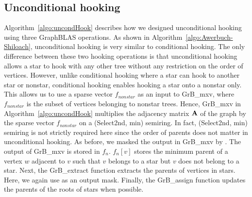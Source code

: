 \subsection{Unconditional hooking}
Algorithm~\ref{algo:uncondHook} describes how we designed unconditional hooking using three GraphBLAS operations.
As shown in Algorithm~\ref{algo:Awerbuch-Shiloach},  unconditional hooking is very similar to conditional hooking. The only difference between these two hooking operations is that unconditional hooking allows a star to hook with any other tree without any restriction on the order of vertices.
However, unlike conditional hooking where a star can hook to another star or nonstar, conditional hooking enables hooking a star onto a nonstar only. 
This allows us to use a sparse vector $f_{nonstar}$ as an input to GrB\_mxv, where $f_{nonstar}$ is the subset of vertices belonging to nonstar trees. 
Hence, GrB\_mxv in  Algorithm~\ref{algo:uncondHook} multiplies the adjacency matrix $\mathbf{A}$ of the graph by the sparse vector $f_{nonstar}$ on a (Select2nd, min) semiring. 
In fact, (Select2nd, min) semiring is not strictly required here since the order of parents does not matter in unconditional hooking.
As before, we masked the output in GrB\_mxv by .
The output of GrB\_mxv is stored in $f_n$.  
$f_n[v]$ stores the minimum parent of a vertex $w$ adjacent to $v$ such that $v$ belongs to a star but $v$ does not belong to a star.  
Next, the GrB\_extract function extracts the parents of vertices in stars. 
Here, we again use  as an output mask.
Finally, the GrB\_assign function updates the parents of the roots of stars when possible.


